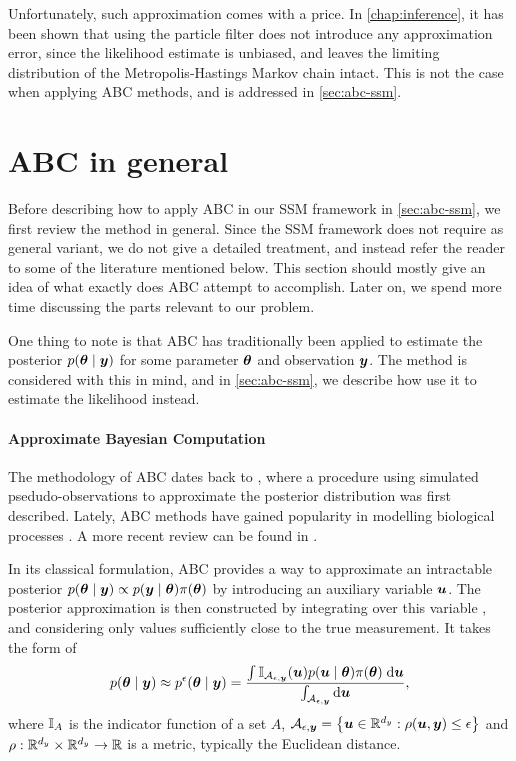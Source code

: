 Unfortunately, such approximation comes with a price. In \autoref{chap:inference}, it has been shown that using the particle filter does not introduce any approximation error, since the likelihood estimate is unbiased, and leaves the limiting distribution of the Metropolis-Hastings Markov chain intact. This is not the case when applying ABC methods, and is addressed in \autoref{sec:abc-ssm}.


\section{ABC in general} \label{sec:abc-general}
Before describing how to apply ABC in our SSM framework in \autoref{sec:abc-ssm}, we first review the method in general. Since the SSM framework does not require as general variant, we do not give a detailed treatment, and instead refer the reader to some of the literature mentioned below. This section should mostly give an idea of what exactly does ABC attempt to accomplish. Later on, we spend more time discussing the parts relevant to our problem.

One thing to note is that ABC has traditionally been applied to estimate the posterior $p(\bm{\theta} \mid \bm{y})$ for some parameter $\bm{\theta}$ and observation $\bm{y}$. The method is considered with this in mind, and in \autoref{sec:abc-ssm}, we describe how use it to estimate the likelihood instead.

\paragraph{Approximate Bayesian Computation}
The methodology of ABC dates back to \cite{abc-old-old}, where a procedure using simulated psedudo-observations to approximate the posterior distribution was first described. Lately, ABC methods have gained popularity in modelling biological processes \citep{abc-old}. A more recent review can be found in \cite{abc-recent}.

In its classical formulation, ABC provides a way to approximate an intractable posterior ${p(\bm{\theta} \mid \bm{y}) \propto p(\bm{y} \mid \bm{\theta}) \pi(\bm{\theta})}$ by introducing an auxiliary variable $\bm{u}$. The posterior approximation is then constructed by integrating over this variable \citep{jasra-filtering}, and considering only values sufficiently close to the true measurement. It takes the form of
\begin{equation} \label{eq:abc-integral}
p(\bm{\theta} \mid \bm{y}) \approx p^\epsilon(\bm{\theta} \mid \bm{y}) = \frac{\int \mathbb{I}_{\mathcal{A}_{\epsilon, \bm{y}}}(\bm{u}) p(\bm{u} \mid \bm{\theta}) \pi(\bm{\theta}) \; \mathrm{d}{\bm{u}}}{\int_{\mathcal{A}_{\epsilon, \bm{y}}} \mathrm{d}{\bm{u}}},
\end{equation}
where $\mathbb{I}_A$ is the indicator function of a set $A$, $\mathcal{A}_{\epsilon, \bm{y}} = \left\{\bm{u} \in \mathbb{R}^{d_y} : \rho(\bm{u}, \bm{y}) \leq \epsilon \right\}$ and $\rho: \mathbb{R}^{d_y} \times \mathbb{R}^{d_y} \to \mathbb{R}$ is a metric, typically the Euclidean distance.

